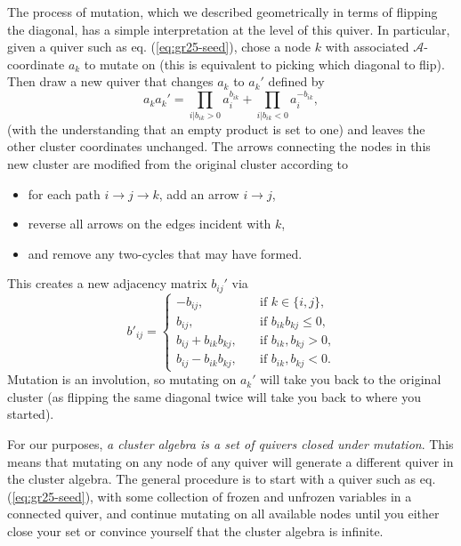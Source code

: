 \documentclass[11pt]{article}
\def\a{\mathcal{A}}
\begin{document}
The process of mutation, which we described geometrically in terms of flipping the diagonal, has a simple interpretation at the level of this quiver. In particular, given a quiver such as eq. (\ref{eq:gr25-seed}), chose a node $k$ with associated $\a$-coordinate $a_k$ to mutate on (this is equivalent to picking which diagonal to flip). Then draw a new quiver that changes $a_{k}$ to $a_{k}'$ defined by
\begin{equation}
  \label{eq:mutation}
  a_{k} a_{k}' = \prod_{i \vert b_{i k} > 0} a_{i}^{b_{i k}} + \prod_{i \vert b_{i k} < 0} a_{i}^{-b_{i k}},
\end{equation} (with the understanding that an empty product is set to one) and leaves the other cluster coordinates unchanged. The arrows connecting the nodes in this new cluster are modified from the original cluster according to
\begin{itemize}
	\item for each path $i\to j \to k$, add an arrow $i\to j$,
	\item reverse all arrows on the edges incident with $k$,
	\item and remove any two-cycles that may have formed.
\end{itemize}
This creates a new adjacency matrix $b_{ij}'$ via 
\begin{equation}
  \label{eq:b-mutation}
  b'_{i j} =
  \begin{cases}
    -b_{i j}, &\quad \text{if $k \in \lbrace i, j\rbrace$,}\\
    b_{i j}, &\quad \text{if $b_{i k} b_{k j} \leq 0$,}\\
    b_{i j} + b_{i k} b_{k j}, &\quad \text{if $b_{i k}, b_{k j} > 0$,}\\
    b_{i j} - b_{i k} b_{k j}, &\quad \text{if $b_{i k}, b_{k j} < 0$.}
  \end{cases}
\end{equation}
Mutation is an involution, so mutating on $a_k'$ will take you back to the original cluster (as flipping the same diagonal twice will take you back to where you started). 

For our purposes, \emph{a cluster algebra is a set of quivers closed under mutation}. This means that mutating on any node of any quiver will generate a different quiver in the cluster algebra. The general procedure is to start with a quiver such as eq. (\ref{eq:gr25-seed}), with some collection of frozen and unfrozen variables in a connected quiver, and continue mutating on all available nodes until you either close your set or convince yourself that the cluster algebra is infinite. 
\end{document}
